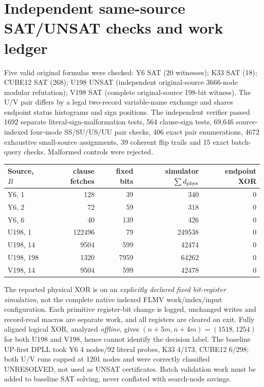 \documentclass[11pt]{article}
\begin{document}
\section{Independent same-source SAT/UNSAT checks and work ledger}
Five valid original formulas were checked: Y6 SAT (20 witnesses); K33 SAT (18); CUBE12 SAT (268); U198 UNSAT (independent original-source 3666-node modular refutation); V198 SAT (complete original-source 198-bit witness). The U/V pair differs by a legal two-record variable-name exchange and shares endpoint status histograms and sign positions. The independent verifier passed 1692 separate literal-sign-malformation tests, 564 clause-sign tests, 69,646 source-indexed four-mode SS/SU/US/UU pair checks, 406 exact pair enumerations, 4672 exhaustive small-source assignments, 39 coherent flip trails and 15 exact batch-query checks. Malformed controls were rejected.
\begin{center}\begin{tabular}{lrrrr}\toprule
Source, $B$ & clause fetches & fixed bits & simulator $\sum d_{\rm phys}$ & endpoint XOR\\\midrule
Y6, 1 &128&39&340&0\\
Y6, 2 &72&59&318&0\\
Y6, 6 &40&139&426&0\\
U198, 1 &122496&79&249538&0\\
U198, 14 &9504&599&42474&0\\
U198, 198 &1320&7959&64262&0\\
V198, 14 &9504&599&42478&0\\\bottomrule
\end{tabular}\end{center}
The reported physical XOR is on an \emph{explicitly declared fixed bit-register simulation}, not the complete native indexed FLMV work/index/input configuration. Each primitive register-bit change is logged, unchanged writes and record-read macros are separate work, and all registers are cleared on exit. Fully aligned logical XOR, analyzed \emph{offline}, gives $(n+5m,n+4m)=(1518,1254)$ for both U198 and V198, hence cannot identify the decision label. The baseline UP-first DPLL took Y6 4 nodes/92 literal probes, K33 4/173, CUBE12 6/298; both U/V runs capped at 1201 nodes and were correctly classified UNRESOLVED, not used as UNSAT certificates. Batch validation work must be added to baseline SAT solving, never conflated with search-node savings.
\end{document}
